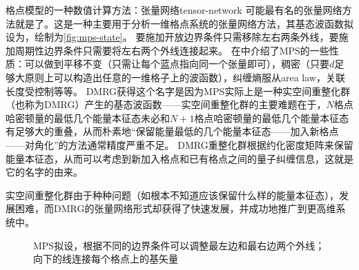 \begin{back}{格点模型的一种数值计算方法：张量网络}{tensor-network}
    可能最有名的张量网络方法就是了。这是一种主要用于分析一维格点系统的张量网络方法，其基态波函数拟设为，绘制为\autoref{fig:mps-state}。
    要施加开放边界条件只需移除左右两条外线，要施加周期性边界条件只需要将左右两个外线连接起来。
    在\cite{Orus_tensor}中介绍了MPS的一些性质：可以做到平移不变（只需让每个蓝点指向同一个张量即可），稠密（只要$d$足够大原则上可以构造出任意的一维格子上的波函数），纠缠熵服从area law，关联长度受控制等等。
    DMRG获得这个名字是因为MPS实际上是一种实空间重整化群（也称为DMRG）产生的基态波函数——实空间重整化群的主要难题在于，$N$格点哈密顿量的最低几个能量本征态未必和$N+1$格点哈密顿量的最低几个能量本征态有足够大的重叠，从而朴素地“保留能量最低的几个能量本征态——加入新格点——对角化”的方法通常精度严重不足。
    DMRG重整化群根据约化密度矩阵来保留能量本征态，从而可以考虑到新加入格点和已有格点之间的量子纠缠信息，这就是它的名字的由来。

    实空间重整化群由于种种问题（如根本不知道应该保留什么样的能量本征态），发展困难，而DMRG的张量网络形式却获得了快速发展，并成功地推广到更高维系统中。
\end{back}

\begin{figure}
    \centering
    
    \caption{MPS拟设，根据不同的边界条件可以调整最左边和最右边两个外线；向下的线连接每个格点上的基矢量}
    \label{fig:mps-state}
\end{figure}